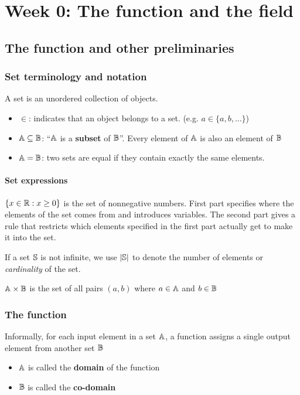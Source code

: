 \chapter{Week 0: The function and the field}


\section{The function and other preliminaries}

\subsection{Set terminology and notation}
\begin{definition}[Set]
  A set is an unordered collection of objects.
\end{definition}
\begin{itemize}
\item $\in$: indicates that an object belongs to a set. (e.g. $a\in\{a,b,\ldots\}$)
\item ${\mathbb{A}} \subseteq {\mathbb{B}}$: ``${\mathbb{A}}$ is a \textbf{subset} of ${\mathbb{B}}$''. Every element of ${\mathbb{A}}$ is also an element of ${\mathbb{B}}$
\item ${\mathbb{A}} = {\mathbb{B}}$: two sets are equal if they contain exactly the same elements.
\end{itemize}

\subsubsection{Set expressions}
$\{ x\in\mathbb{R} : x \ge 0 \}$ is the set of nonnegative numbers. First part specifies where the elements of the set comes from and introduces variables. The second part gives a rule that restricts which elements specified in the first part actually get to make it into the set.

\begin{definition}[Cardinality]
  If a set ${\mathbb{S}}$ is not infinite, we use $|{\mathbb{S}}|$ to denote the number of elements or \emph{cardinality} of the set.
\end{definition}

\begin{definition}
  ${\mathbb{A}} \times {\mathbb{B}}$ is the set of all pairs $(a, b)$ where $a\in{\mathbb{A}}$ and $b\in{\mathbb{B}}$
\end{definition}

\subsection{The function}
Informally, for each input element in a set ${\mathbb{A}}$, a function assigns a single output element from another set ${\mathbb{B}}$
\begin{itemize}
\item ${\mathbb{A}}$ is called the \textbf{domain} of the function
\item ${\mathbb{B}}$ is called the \textbf{co-domain}
\end{itemize}

